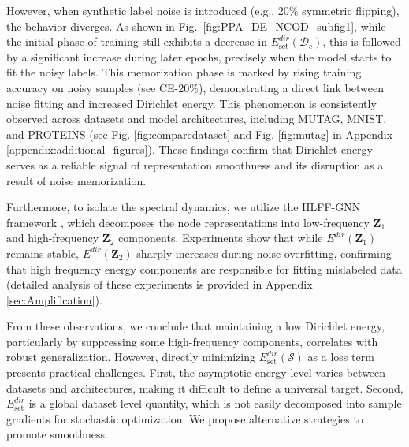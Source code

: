 However, when synthetic label noise is introduced (e.g., 20\% symmetric flipping), the behavior diverges. As shown in Fig.~\ref{fig:PPA_DE_NCOD_subfig1}, while the initial phase of training still exhibits a decrease in \( E^{dir}_{\text{set}}(\mathcal{D}_c) \), this is followed by a significant increase during later epochs, precisely when the model starts to fit the noisy labels. This memorization phase is marked by rising training accuracy on noisy samples (see CE-20\%), demonstrating a direct link between noise fitting and increased Dirichlet energy.
This phenomenon is consistently observed across datasets and model architectures, including MUTAG, MNIST, and PROTEINS (see 
Fig. \ref{fig:comparedataset} and Fig. \ref{fig:mutag} in Appendix \ref{appendix:additional_figures}). These findings confirm that Dirichlet energy serves as a reliable signal of representation smoothness and its disruption as a result of noise memorization.

Furthermore, to isolate the spectral dynamics, we utilize the HLFF-GNN framework \citet{hlffgnn}, which decomposes the node representations into low-frequency \( \mathbf{Z}_1 \) and high-frequency \( \mathbf{Z}_2 \) components. Experiments show that while \( E^{dir}(\mathbf{Z}_1) \) remains stable, \( E^{dir}(\mathbf{Z}_2) \) sharply increases during noise overfitting, confirming that high frequency energy components are responsible for fitting mislabeled data (detailed analysis of these experiments is provided in Appendix \ref{sec:Amplification}).

From these observations, we conclude that maintaining a low Dirichlet energy, particularly by suppressing some high-frequency components, correlates with robust generalization. However, directly minimizing \( E^{dir}_{\text{set}}(\mathcal{S}) \) as a loss term presents practical challenges. First, the asymptotic energy level varies between datasets and architectures, making it difficult to define a universal target. Second, \( E^{dir}_{\text{set}} \) is a global dataset level quantity, which is not easily decomposed into sample gradients for stochastic optimization. We propose alternative strategies to promote smoothness. 

